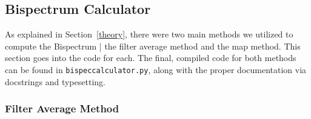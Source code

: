 \documentclass[11pt]{article}
\renewcommand{\_}[1]{\underline{ #1 }}
\newcommand{\us}{\textunderscore}
\begin{document}
{\subsection{Bispectrum Calculator}\label{bispeccalccode}

As explained in Section~\ref{theory}, there were two main methods we utilized to compute the Bispectrum | the filter average method and the map method. This section goes into the code for each. The final, compiled code for both methods can be found in \texttt{bispec\us calculator.py}, along with the proper documentation via docstrings and typesetting.

\subsubsection{Filter Average Method}\label{averagemethodcode}

}
\end{document}
